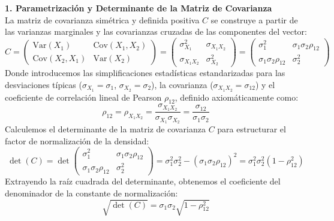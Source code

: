 \begin{ejemplo}[Deducción Explícita para la Dimensión $n = 2$]
\noindent \textbf{1. Parametrización y Determinante de la Matriz de Covarianza} \\
La matriz de covarianza simétrica y definida positiva $C$ se construye a partir de las varianzas marginales y las covarianzas cruzadas de las componentes del vector:
\[
C = \begin{pmatrix} \text{Var}(X_1) & \text{Cov}(X_1, X_2) \\ \text{Cov}(X_2, X_1) & \text{Var}(X_2) \end{pmatrix} = \begin{pmatrix} \sigma_{X_1}^2 & \sigma_{X_1 X_2} \\ \sigma_{X_1 X_2} & \sigma_{X_2}^2 \end{pmatrix} = \begin{pmatrix} \sigma_1^2 & \sigma_1 \sigma_2 \rho_{12} \\ \sigma_1 \sigma_2 \rho_{12} & \sigma_2^2 \end{pmatrix}
\]
Donde introducemos las simplificaciones estadísticas estandarizadas para las desviaciones típicas ($\sigma_{X_1} = \sigma_1$, $\sigma_{X_2} = \sigma_2$), la covarianza ($\sigma_{X_1 X_2} = \sigma_{12}$) y el coeficiente de correlación lineal de Pearson $\rho_{12}$, definido axiomáticamente como:
\[
\rho_{12} = \rho_{X_1 X_2} = \frac{\sigma_{X_1 X_2}}{\sigma_{X_1} \sigma_{X_2}} = \frac{\sigma_{12}}{\sigma_1 \sigma_2}
\]
Calculemos el determinante de la matriz de covarianza $C$ para estructurar el factor de normalización de la densidad:
\[
\det(C) = \det \begin{pmatrix} \sigma_1^2 & \sigma_1 \sigma_2 \rho_{12} \\ \sigma_1 \sigma_2 \rho_{12} & \sigma_2^2 \end{pmatrix} = \sigma_1^2 \sigma_2^2 - (\sigma_1 \sigma_2 \rho_{12})^2 = \sigma_1^2 \sigma_2^2 (1 - \rho_{12}^2)
\]
Extrayendo la raíz cuadrada del determinante, obtenemos el coeficiente del denominador de la constante de normalización:
\[
\sqrt{\det(C)} = \sigma_1 \sigma_2 \sqrt{1 - \rho_{12}^2}
\]


\end{ejemplo}
